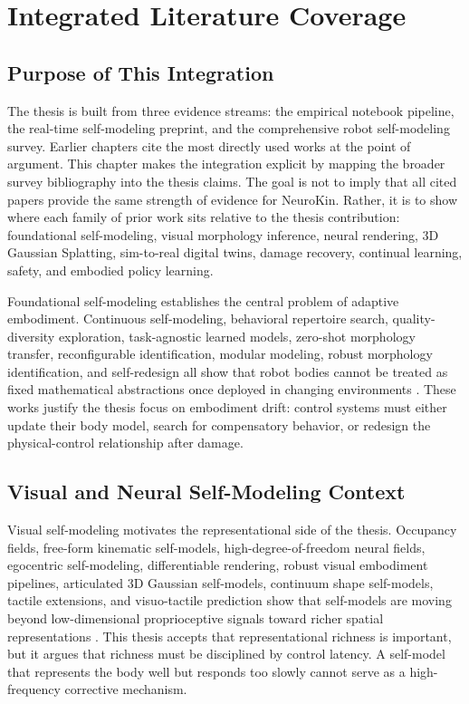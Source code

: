 \documentclass[12pt,a4paper,oneside]{report}
\begin{document}
\chapter{Integrated Literature Coverage}

\section{Purpose of This Integration}

The thesis is built from three evidence streams: the empirical notebook pipeline, the real-time self-modeling preprint, and the comprehensive robot self-modeling survey. Earlier chapters cite the most directly used works at the point of argument. This chapter makes the integration explicit by mapping the broader survey bibliography into the thesis claims. The goal is not to imply that all cited papers provide the same strength of evidence for NeuroKin. Rather, it is to show where each family of prior work sits relative to the thesis contribution: foundational self-modeling, visual morphology inference, neural rendering, 3D Gaussian Splatting, sim-to-real digital twins, damage recovery, continual learning, safety, and embodied policy learning.

Foundational self-modeling establishes the central problem of adaptive embodiment. Continuous self-modeling, behavioral repertoire search, quality-diversity exploration, task-agnostic learned models, zero-shot morphology transfer, reconfigurable identification, modular modeling, robust morphology identification, and self-redesign all show that robot bodies cannot be treated as fixed mathematical abstractions once deployed in changing environments \cite{bongard2006resilient,cully2015robots,carrozza2006cyberhand,koos2013fast,mouret2015illuminating,kwiatkowski2019task,kwiatkowski2019zeroshot,hu2024reconfigurable,dogra2022unified,farghdani2025robust,yu2026kinematicself}. These works justify the thesis focus on embodiment drift: control systems must either update their body model, search for compensatory behavior, or redesign the physical-control relationship after damage.

\section{Visual and Neural Self-Modeling Context}

Visual self-modeling motivates the representational side of the thesis. Occupancy fields, free-form kinematic self-models, high-degree-of-freedom neural fields, egocentric self-modeling, differentiable rendering, robust visual embodiment pipelines, articulated 3D Gaussian self-models, continuum shape self-models, tactile extensions, and visuo-tactile prediction show that self-models are moving beyond low-dimensional proprioceptive signals toward richer spatial representations \cite{chen2022full,hu2024teaching,schulze2024high,hu2024egocentric,liu2024differentiable,rezvani2024robust,hu2025learning,yu2024shape,lee2026tactiverse,li2024flowtouch}. This thesis accepts that representational richness is important, but it argues that richness must be disciplined by control latency. A self-model that represents the body well but responds too slowly cannot serve as a high-frequency corrective mechanism.
\end{document}
